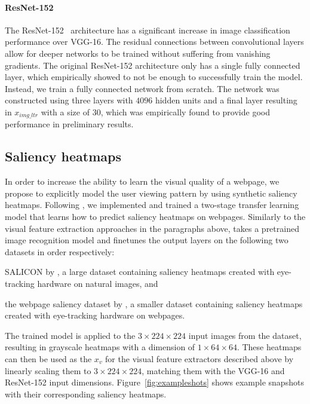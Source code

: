 
\paragraph{ResNet-152}
The ResNet-152~\cite{he2016deep} architecture has a significant increase in image classification performance over VGG-16. The residual connections between convolutional layers allow for deeper networks to be trained without suffering from vanishing gradients. The original ResNet-152 architecture only has a single fully connected layer, which empirically showed to not be enough to successfully train the model. Instead, we train a fully connected network from scratch. The network was constructed using three layers with $4096$ hidden units and a final layer resulting in $x_{img\_ltr}$ with a size of $30$, which was empirically found to provide good performance in preliminary results.


\subsection{Saliency heatmaps}
In order to increase the ability to learn the visual quality of a webpage, we propose to explicitly model the user viewing pattern by using synthetic saliency heatmaps. 
Following \cite{shan2017two}, we implemented and trained a two-stage transfer learning model that learns how to predict saliency heatmaps on webpages.
Similarly to the visual feature extraction approaches in the paragraphs above, \cite{shan2017two} takes a pretrained image recognition model and finetunes the output layers on the following two datasets in order respectively:
\begin{inparaenum}[(i)]
\item SALICON by \cite{jiang2015salicon}, a large dataset containing saliency heatmaps created with eye-tracking hardware on natural images, and 
\item the webpage saliency dataset by \cite{shen2014webpage}, a smaller dataset containing saliency heatmaps created with eye-tracking hardware on webpages.
\end{inparaenum}

The trained model is applied to the $3\times224\times224$ input images from the \datasetname data\-set, resulting in grayscale heatmaps with a dimension of $1\times64\times64$. These heatmaps can then be used as the $x_{v}$ for the visual feature extractors described above by linearly scaling them to $3\times224\times224$, matching them with the VGG-16 and ResNet-152 input dimensions. Figure~\ref{fig:exampleshots} shows example snapshots with their corresponding saliency heatmaps.

